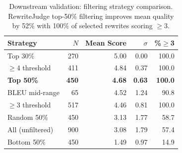 \begin{table}[t]
\centering
\caption{Downstream validation: filtering strategy comparison. RewriteJudge top-50\% filtering improves mean quality by 52\% with 100\% of selected rewrites scoring $\geq$3.}
\label{tab:downstream}
\begin{tabular}{lrrrr}
\toprule
Strategy & $N$ & Mean Score & $\sigma$ & \%$\geq$3 \\
\midrule
Top 30\% & 270 & 5.00 & 0.00 & 100.0 \\
$\geq$4 threshold & 411 & 4.84 & 0.37 & 100.0 \\
\textbf{Top 50\%} & \textbf{450} & \textbf{4.68} & \textbf{0.63} & \textbf{100.0} \\
BLEU mid-range & 65 & 4.52 & 1.24 & 90.8 \\
$\geq$3 threshold & 517 & 4.46 & 0.81 & 100.0 \\
Random 50\% & 450 & 3.13 & 1.77 & 58.7 \\
All (unfiltered) & 900 & 3.08 & 1.79 & 57.4 \\
Bottom 50\% & 450 & 1.49 & 0.97 & 14.9 \\
\bottomrule
\end{tabular}
\end{table}